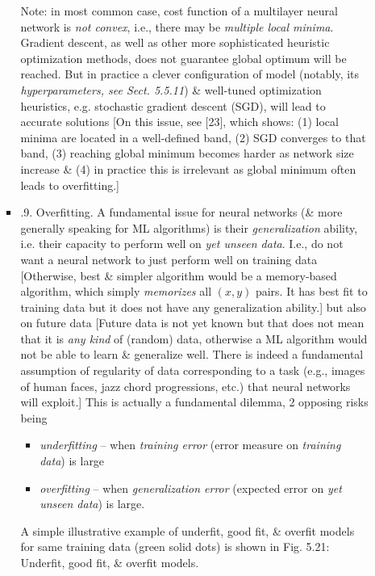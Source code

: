 \documentclass{article}
\begin{document}
\begin{itemize}
\begin{itemize}
\begin{itemize}
			Note: in most common case, cost function of a multilayer neural network is {\it not convex}, i.e., there may be {\it multiple local minima}. Gradient descent, as well as other more sophisticated heuristic optimization methods, does not guarantee global optimum will be reached. But in practice a clever configuration of model (notably, its {\it hyperparameters, see Sect. 5.5.11}) \& well-tuned optimization heuristics, e.g. stochastic gradient descent (SGD), will lead to accurate solutions [On this issue, see [23], which shows: (1) local minima are located in a well-defined band, (2) SGD converges to that band, (3) reaching global minimum becomes harder as network size increase \& (4) in practice this is irrelevant as global minimum often leads to overfitting.]
			\item {.9. Overfitting.} A fundamental issue for neural networks (\& more generally speaking for ML algorithms) is their {\it generalization} ability, i.e. their capacity to perform well on {\it yet unseen data}. I.e., do not want a neural network to just perform well on training data [Otherwise, best \& simpler algorithm would be a memory-based algorithm, which simply {\it memorizes} all $(x,y)$ pairs. It has best fit to training data but it does not have any generalization ability.] but also on future data [Future data is not yet known but that does not mean that it is {\it any kind} of (random) data, otherwise a ML algorithm would not be able to learn \& generalize well. There is indeed a fundamental assumption of regularity of data corresponding to a task (e.g., images of human faces, jazz chord progressions, etc.) that neural networks will exploit.] This is actually a fundamental dilemma, 2 opposing risks being
			\begin{itemize}
				\item {\it underfitting} -- when {\it training error} (error measure on {\it training data}) is large
				\item {\it overfitting} -- when {\it generalization error} (expected error on {\it yet unseen data}) is large.
			\end{itemize}
			A simple illustrative example of underfit, good fit, \& overfit models for same training data (green solid dots) is shown in {\sf Fig. 5.21: Underfit, good fit, \& overfit models.}


\end{itemize}
\end{itemize}
\end{itemize}
\end{document}
